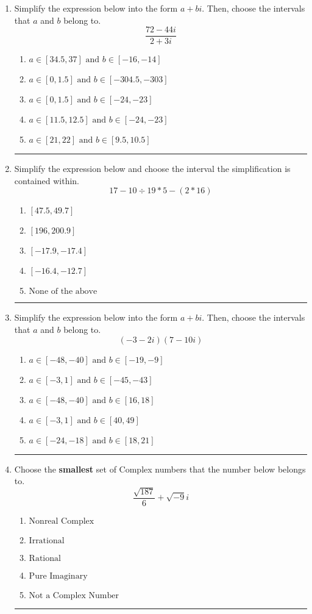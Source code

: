 \documentclass[14pt]{extbook}
\newcommand{\litem}[1]{\item#1\hspace*{-1cm}\rule{\textwidth}{0.4pt}}
\begin{document}
\begin{enumerate}
\litem{
Simplify the expression below into the form $a+bi$. Then, choose the intervals that $a$ and $b$ belong to.\[ \frac{72 - 44 i}{2 + 3 i} \]\begin{enumerate}[label=\Alph*.]
\item \( a \in [34.5, 37] \text{ and } b \in [-16, -14] \)
\item \( a \in [0, 1.5] \text{ and } b \in [-304.5, -303] \)
\item \( a \in [0, 1.5] \text{ and } b \in [-24, -23] \)
\item \( a \in [11.5, 12.5] \text{ and } b \in [-24, -23] \)
\item \( a \in [21, 22] \text{ and } b \in [9.5, 10.5] \)

\end{enumerate} }
\litem{
Simplify the expression below and choose the interval the simplification is contained within.\[ 17 - 10 \div 19 * 5 - (2 * 16) \]\begin{enumerate}[label=\Alph*.]
\item \( [47.5, 49.7] \)
\item \( [196, 200.9] \)
\item \( [-17.9, -17.4] \)
\item \( [-16.4, -12.7] \)
\item \( \text{None of the above} \)

\end{enumerate} }
\litem{
Simplify the expression below into the form $a+bi$. Then, choose the intervals that $a$ and $b$ belong to.\[ (-3 - 2 i)(7 - 10 i) \]\begin{enumerate}[label=\Alph*.]
\item \( a \in [-48, -40] \text{ and } b \in [-19, -9] \)
\item \( a \in [-3, 1] \text{ and } b \in [-45, -43] \)
\item \( a \in [-48, -40] \text{ and } b \in [16, 18] \)
\item \( a \in [-3, 1] \text{ and } b \in [40, 49] \)
\item \( a \in [-24, -18] \text{ and } b \in [18, 21] \)

\end{enumerate} }
\litem{
Choose the \textbf{smallest} set of Complex numbers that the number below belongs to.\[ \frac{\sqrt{187}}{6}+\sqrt{-9}i \]\begin{enumerate}[label=\Alph*.]
\item \( \text{Nonreal Complex} \)
\item \( \text{Irrational} \)
\item \( \text{Rational} \)
\item \( \text{Pure Imaginary} \)
\item \( \text{Not a Complex Number} \)


\end{enumerate}}
\end{enumerate}
\end{document}
